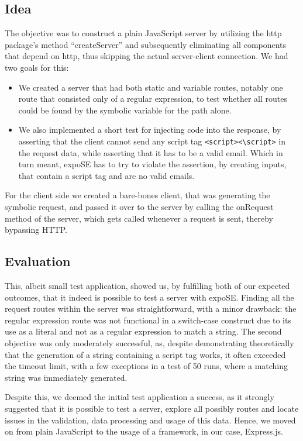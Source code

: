 \subsection{Idea}

The objective was to construct a plain JavaScript server by utilizing the http package's method “createServer” and subsequently eliminating all components that depend on http, thus skipping the actual server-client connection.
We had two goals for this: 
\begin{itemize}
    \item  We created a server that had both static and variable routes, notably one route that consisted only of a regular expression, to test whether all routes could be found by the symbolic variable for the path alone.
    \item  We also implemented a short test for injecting code into the response, by asserting that the client cannot send any script tag \lstinline{<script><\script>} in the request data, while asserting that it has to be a valid email. Which in turn meant, expoSE has to try to violate the assertion, by creating inputs, that contain a script tag and are no valid emails. 
\end{itemize}
For the client side we created a bare-bones client, that was generating the symbolic request, and passed it over to the server by calling the onRequest method of the server, which gets called whenever a request is sent, thereby bypassing HTTP. 

\subsection{Evaluation}
This, albeit small test application, showed us, by fulfilling both of our expected outcomes, that it indeed is possible to test a server with expoSE. Finding all the request routes within the server was straightforward, with a minor drawback: the regular expression route was not functional in a switch-case construct due to its use as a literal and not as a regular expression to match a string. 
The second objective was only moderately successful, as, despite demonstrating theoretically that the generation of a string containing a script tag works, it often exceeded the timeout limit, with a few exceptions in a test of 50 runs, where a matching string was immediately generated.

Despite this, we deemed the initial test application a success, as it strongly suggested that it is possible to test a server, explore all possibly routes and locate issues in the validation, data processing and usage of this data. Hence, we moved on from plain JavaScript to the usage of a framework, in our case, Express.js.
